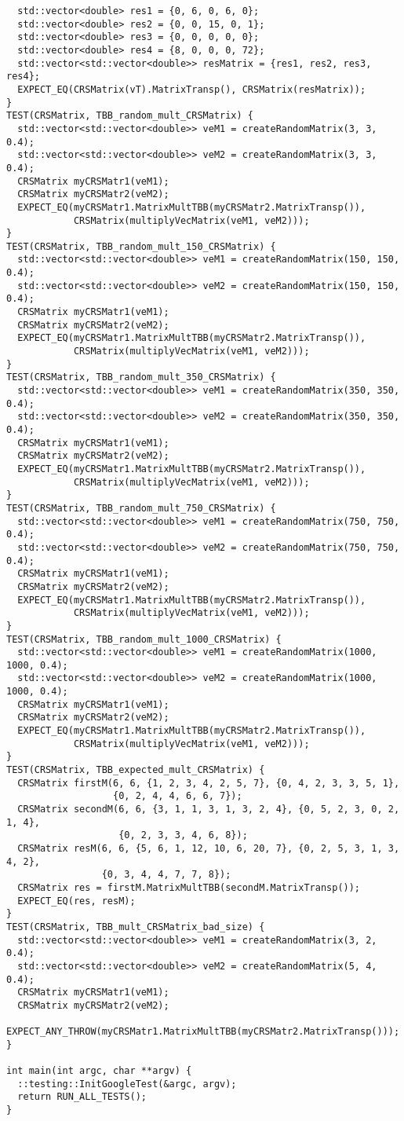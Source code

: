 \documentclass[14pt, russian]{extarticle}
\begin{document}
\begin{lstlisting}
  std::vector<double> res1 = {0, 6, 0, 6, 0};
  std::vector<double> res2 = {0, 0, 15, 0, 1};
  std::vector<double> res3 = {0, 0, 0, 0, 0};
  std::vector<double> res4 = {8, 0, 0, 0, 72};
  std::vector<std::vector<double>> resMatrix = {res1, res2, res3, res4};
  EXPECT_EQ(CRSMatrix(vT).MatrixTransp(), CRSMatrix(resMatrix));
}
TEST(CRSMatrix, TBB_random_mult_CRSMatrix) {
  std::vector<std::vector<double>> veM1 = createRandomMatrix(3, 3, 0.4);
  std::vector<std::vector<double>> veM2 = createRandomMatrix(3, 3, 0.4);
  CRSMatrix myCRSMatr1(veM1);
  CRSMatrix myCRSMatr2(veM2);
  EXPECT_EQ(myCRSMatr1.MatrixMultTBB(myCRSMatr2.MatrixTransp()),
            CRSMatrix(multiplyVecMatrix(veM1, veM2)));
}
TEST(CRSMatrix, TBB_random_mult_150_CRSMatrix) {
  std::vector<std::vector<double>> veM1 = createRandomMatrix(150, 150, 0.4);
  std::vector<std::vector<double>> veM2 = createRandomMatrix(150, 150, 0.4);
  CRSMatrix myCRSMatr1(veM1);
  CRSMatrix myCRSMatr2(veM2);
  EXPECT_EQ(myCRSMatr1.MatrixMultTBB(myCRSMatr2.MatrixTransp()),
            CRSMatrix(multiplyVecMatrix(veM1, veM2)));
}
TEST(CRSMatrix, TBB_random_mult_350_CRSMatrix) {
  std::vector<std::vector<double>> veM1 = createRandomMatrix(350, 350, 0.4);
  std::vector<std::vector<double>> veM2 = createRandomMatrix(350, 350, 0.4);
  CRSMatrix myCRSMatr1(veM1);
  CRSMatrix myCRSMatr2(veM2);
  EXPECT_EQ(myCRSMatr1.MatrixMultTBB(myCRSMatr2.MatrixTransp()),
            CRSMatrix(multiplyVecMatrix(veM1, veM2)));
}
TEST(CRSMatrix, TBB_random_mult_750_CRSMatrix) {
  std::vector<std::vector<double>> veM1 = createRandomMatrix(750, 750, 0.4);
  std::vector<std::vector<double>> veM2 = createRandomMatrix(750, 750, 0.4);
  CRSMatrix myCRSMatr1(veM1);
  CRSMatrix myCRSMatr2(veM2);
  EXPECT_EQ(myCRSMatr1.MatrixMultTBB(myCRSMatr2.MatrixTransp()),
            CRSMatrix(multiplyVecMatrix(veM1, veM2)));
}
TEST(CRSMatrix, TBB_random_mult_1000_CRSMatrix) {
  std::vector<std::vector<double>> veM1 = createRandomMatrix(1000, 1000, 0.4);
  std::vector<std::vector<double>> veM2 = createRandomMatrix(1000, 1000, 0.4);
  CRSMatrix myCRSMatr1(veM1);
  CRSMatrix myCRSMatr2(veM2);
  EXPECT_EQ(myCRSMatr1.MatrixMultTBB(myCRSMatr2.MatrixTransp()),
            CRSMatrix(multiplyVecMatrix(veM1, veM2)));
}
TEST(CRSMatrix, TBB_expected_mult_CRSMatrix) {
  CRSMatrix firstM(6, 6, {1, 2, 3, 4, 2, 5, 7}, {0, 4, 2, 3, 3, 5, 1},
                   {0, 2, 4, 4, 6, 6, 7});
  CRSMatrix secondM(6, 6, {3, 1, 1, 3, 1, 3, 2, 4}, {0, 5, 2, 3, 0, 2, 1, 4},
                    {0, 2, 3, 3, 4, 6, 8});
  CRSMatrix resM(6, 6, {5, 6, 1, 12, 10, 6, 20, 7}, {0, 2, 5, 3, 1, 3, 4, 2},
                 {0, 3, 4, 4, 7, 7, 8});
  CRSMatrix res = firstM.MatrixMultTBB(secondM.MatrixTransp());
  EXPECT_EQ(res, resM);
}
TEST(CRSMatrix, TBB_mult_CRSMatrix_bad_size) {
  std::vector<std::vector<double>> veM1 = createRandomMatrix(3, 2, 0.4);
  std::vector<std::vector<double>> veM2 = createRandomMatrix(5, 4, 0.4);
  CRSMatrix myCRSMatr1(veM1);
  CRSMatrix myCRSMatr2(veM2);
  EXPECT_ANY_THROW(myCRSMatr1.MatrixMultTBB(myCRSMatr2.MatrixTransp()));
}

int main(int argc, char **argv) {
  ::testing::InitGoogleTest(&argc, argv);
  return RUN_ALL_TESTS();
}
	\end{lstlisting}
	\newpage
	
\end{document}

